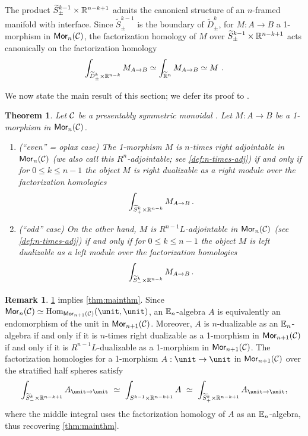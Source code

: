 \documentclass[10pt, reqno, twoside
, final
]{amsart}
\numberwithin{equation}{subsection}%
\theoremstyle{definition}
\theoremstyle{definition}
\theoremstyle{definition}
\theoremstyle{definition}
\theoremstyle{definition}
\theoremstyle{definition}
\theoremstyle{definition}
\theoremstyle{definition}
\theoremstyle{definition}
\theoremstyle{plain}
\newtheorem{thm}[defn]{Theorem}
\theoremstyle{definition}
\theoremstyle{plain}
\theoremstyle{definition}
\theoremstyle{plain}
\theoremstyle{definition}
\newtheorem{rmk}[defn]{Remark}
\theoremstyle{definition}
\theoremstyle{plain}
\theoremstyle{plain}
\theoremstyle{definition}
\theoremstyle{plain}
\theoremstyle{plain}
\theoremstyle{plain}
\begin{document}
The product $\widetilde{S}^{k-1}_{\pm} \times \mathbb{R}^{n-k+1}$ admits the canonical structure of an $n$-framed manifold with interface. Since $\widetilde{S}^{k-1}_{\pm}$ is the boundary of $\widetilde{D}^k_{\pm}$, for $M:A\to B$ a 1-morphism in $\mathsf{Mor}_{n}(\mathcal{C})$, the factorization homology of $M$ over $\widetilde{S}^{k-1}_{\pm} \times \mathbb{R}^{n-k+1}$ acts canonically on the factorization homology
\begin{align*}
    \int_{\widetilde{D}^{k}_{\pm} \times \mathbb{R}^{n-k}} M_{A\to B} \simeq \int_{\widetilde{\mathbb{R}}^n} M_{A\to B} \simeq M \ .
\end{align*}

We now state the main result of this section; we defer its proof to .

\begin{thm}\label{thm:main-oplax-thm}
Let $\mathcal{C}$ be a presentably symmetric monoidal \infcatt. Let $M:A\to B$ be a 1-morphism in $\mathsf{Mor}_n(\mathcal{C})$.
 \begin{enumerate}
 \item {\em (``even'' = oplax case)}  The 1-morphism $M$ is $n$-times right adjointable in $\mathsf{Mor}_{n}(\mathcal{C})$ (we also call this $R^n$-adjointable; see \cref{def:n-times-adj}) if and only if for $0\leq k \leq n-1$ the object $M$ is right dualizable as a right module over the factorization homologies 
\[  \int_{\widetilde{S}^{k}_{+} \times \mathbb{R}^{n-k}} M_{A\to B} \, .\] 

\item {\em (``odd'' case)}
On the other hand, $M$ is $R^{n-1}L$-adjointable in $\mathsf{Mor}_{n}(\mathcal{C})$ (see \cref{def:n-times-adj}) if and only if for $0\leq k \leq n-1$ the object $M$ is left dualizable as a left module over the factorization homologies 
\[  \int_{\widetilde{S}^{k}_{-}\times \mathbb{R}^{n-k}} M_{A\to B} \, . \] 

 \end{enumerate}
\end{thm}

\begin{rmk}
\cref{thm:main-oplax-thm} implies \cref{thm:mainthm}. Since $\mor_{n}(\icat) \simeq \Hom_{\mor_{n+1}(\icat)}(\unit,\unit)$, an $\mathbb{E}_{n}$-algebra $A$ is equivalently an endomorphism of the unit in $\mathsf{Mor}_{n+1}(\mathcal{C})$. Moreover, $A$ is $n$-dualizable as an $\mathbb{E}_{n}$-algebra if and only if it is $n$-times right dualizable as a 1-morphism in $\mathsf{Mor}_{n+1}(\mathcal{C})$ if and only if it is $R^{n-1}L$-dualizable as a 1-morphism in $\mathsf{Mor}_{n+1}(\mathcal{C})$. The factorization homologies for a 1-morphism $A:\unit \to \unit$ in $\mathsf{Mor}_{n+1}(\mathcal{C})$ over the stratified half spheres satisfy
\begin{equation*}
    \int_{\widetilde{S}^{k}_{-}\times \R^{n-k+1}} A_{\unit\to \unit} \ \simeq\ \int_{S^{k-1} \times \R^{n-k+1}} A  \ \simeq \ \int_{\widetilde{S}^{k}_{+}\times \R^{n-k+1}} A_{\unit \to \unit},
\end{equation*}
where the middle integral uses the factorization homology of $A$ as an $\mathbb{E}_{n}$-algebra, thus recovering \cref{thm:mainthm}.

\end{rmk}
\end{document}
